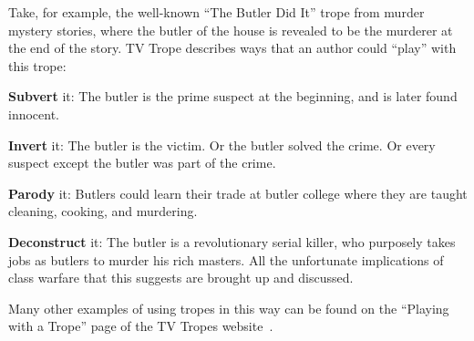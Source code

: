 Take, for example, the well-known ``The Butler Did It'' trope from murder
mystery stories, where the butler of the house is revealed to be the murderer at
the end of the story. TV Trope describes ways that an author could ``play'' with this trope:

\begin{compactitem}
  \item \textbf{Subvert} it: The butler is the prime suspect at the beginning, and is later found innocent.
  \item \textbf{Invert} it: The butler is the victim. Or the butler solved the crime. Or every suspect except the butler was part of the crime.
  \item \textbf{Parody} it: Butlers could learn their trade at butler college where they are taught cleaning, cooking, and murdering.
  \item \textbf{Deconstruct} it: The butler is a revolutionary serial killer, who purposely takes jobs as butlers to murder his rich masters. All the unfortunate implications of class warfare that this suggests are brought up and discussed.
\end{compactitem}

Many other examples of using tropes in this way can be found on the ``Playing
with a Trope'' page of the TV Tropes website~\cite{playing-tropes}.


